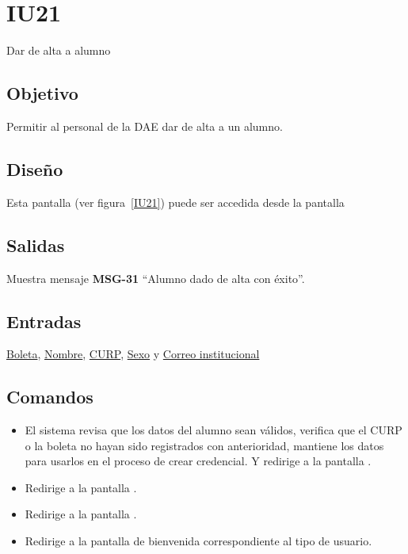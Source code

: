 
\section{IU21} {Dar de alta a alumno}

\subsection{Objetivo}
	Permitir al personal de la DAE dar de alta a un alumno.
\subsection{Diseño}
    Esta pantalla  (ver figura~\ref{IU21}) puede ser accedida desde la pantalla 


\subsection{Salidas}
Muestra mensaje {\bf MSG-31} ``Alumno dado de alta con éxito''.
\subsection{Entradas}
    \hyperlink{Alumno.Boleta}{Boleta}, \hyperlink{Alumno.Nombre}{Nombre}, \hyperlink{Alumno.CURP}{CURP}, \hyperlink{Alumno.Sexo}{Sexo} y \hyperlink{Alumno.Correo institucional}{Correo institucional}
\subsection{Comandos}
\begin{itemize}
    \item {}  El sistema revisa que los datos del alumno sean válidos, verifica que el CURP o la boleta no hayan sido registrados con anterioridad, mantiene los datos para usarlos en el proceso de crear credencial. Y redirige a la pantalla .
    \item {} Redirige a la pantalla .
    \item {} Redirige a la pantalla .
    \item {} Redirige a la pantalla de bienvenida correspondiente al tipo de usuario.
    
\end{itemize}

